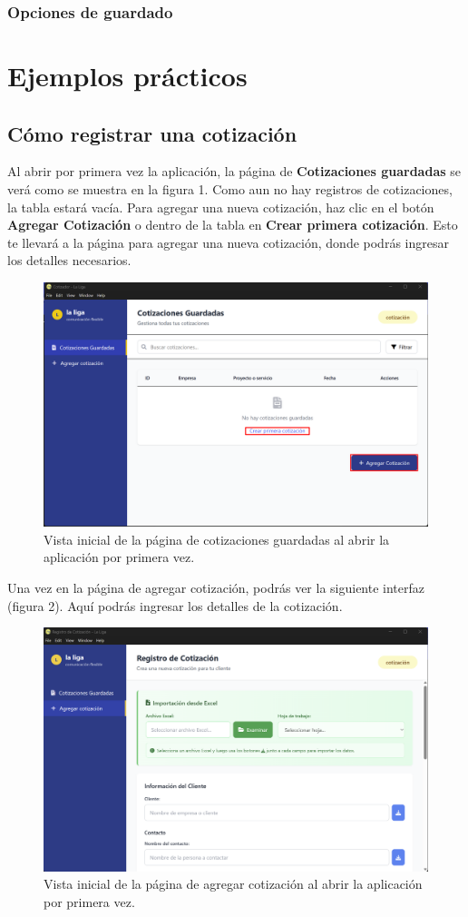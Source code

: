 \documentclass{Pretexto/bluereport}
\begin{document}
\subsubsection{Opciones de guardado}

\section{Ejemplos prácticos}
\subsection{Cómo registrar una cotización}
Al abrir por primera vez la aplicación, la página de \textbf{Cotizaciones guardadas} se verá como se muestra en la figura 1.
Como aun no hay registros de cotizaciones, la tabla estará vacía. Para agregar una nueva cotización, haz clic en el botón \textbf{Agregar Cotización} o dentro de
la tabla en \textbf{Crear primera cotización}. Esto te llevará a la página para agregar una nueva cotización, donde podrás ingresar los detalles necesarios.
\begin{figure}[H]
    \centering
        \includegraphics[width=0.85\linewidth]{img/abrir_primera_vez.png}
    \caption{Vista inicial de la página de cotizaciones guardadas al abrir la aplicación por primera vez.}
    \label{fig:vista_inicial}
\end{figure}
Una vez en la página de agregar cotización, podrás ver la siguiente interfaz (figura 2). Aquí podrás ingresar los detalles de la cotización.
\begin{figure}[H] 
    \centering
        \includegraphics[width=0.85\linewidth]{img/add_cotizacion_inicial.png}
    \caption{Vista inicial de la página de agregar cotización al abrir la aplicación por primera vez.}
    \label{fig:vista_inicial_add}
\end{figure}
\end{document}

